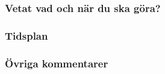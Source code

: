 \documentclass[a4paper]{article}
\begin{document}


\subsubsection{Vetat vad och när du ska göra?}



\subsubsection{Tidsplan}



\subsubsection{Övriga kommentarer}
\end{document}
